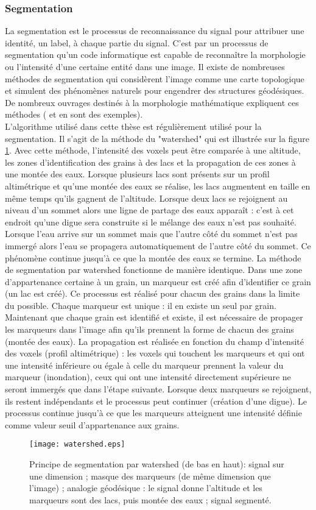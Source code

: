 		\subsubsection{Segmentation}
			La segmentation est le processus de reconnaissance du signal pour attribuer une identité, un label, à chaque partie du signal. C'est par un processus de segmentation qu'un code informatique est capable de reconnaître la morphologie ou l'intensité d'une certaine entité dans une image. Il existe de nombreuses méthodes de segmentation qui considèrent l'image comme une carte topologique et simulent des phénomènes naturels pour engendrer des structures géodésiques. De nombreux ouvrages destinés à la morphologie mathématique expliquent ces méthodes (\citet{haralick_image_1987} et \citet{dougherty_mathematical_1992} en sont des exemples).
			\\L'algorithme utilisé dans cette thèse est régulièrement utilisé pour la segmentation. Il s'agit de la méthode du "watershed" qui est illustrée sur la figure \ref{fig03:watershed}. Avec cette méthode, l'intensité des voxels peut être comparée à une altitude, les zones d'identification des grains à des lacs et la propagation de ces zones à une montée des eaux. Lorsque plusieurs lacs sont présents sur un profil altimétrique et qu'une montée des eaux se réalise, les lacs augmentent en taille en même temps qu'ils gagnent de l'altitude. Lorsque deux lacs se rejoignent au niveau d'un sommet alors une ligne de partage des eaux apparaît : c'est à cet endroit qu'une digue sera construite si le mélange des eaux n'est pas souhaité. Lorsque l'eau arrive sur un sommet mais que l'autre côté du sommet n'est pas immergé alors l'eau se propagera automatiquement de l'autre côté du sommet. Ce phénomène continue jusqu'à ce que la montée des eaux se termine.
			La méthode de segmentation par watershed fonctionne de manière identique. Dans une zone d'appartenance certaine à un grain, un marqueur est créé afin d'identifier ce grain (un lac est créé). Ce processus est réalisé pour chacun des grains dans la limite du possible. Chaque marqueur est unique : il en existe un seul par grain. Maintenant que chaque grain est identifié et existe, il est nécessaire de propager les marqueurs dans l'image afin qu'ils prennent la forme de chacun des grains (montée des eaux). La propagation est réalisée en fonction du champ d'intensité des voxels (profil altimétrique) : les voxels qui touchent les marqueurs et qui ont une intensité inférieure ou égale à celle du marqueur prennent la valeur du marqueur (inondation), ceux qui ont une intensité directement supérieure ne seront immergés que dans l'étape suivante. Lorsque deux marqueurs se rejoignent, ils restent indépendants et le processus peut continuer (création d'une digue). Le processus continue jusqu'à ce que les marqueurs atteignent une intensité définie comme valeur seuil d'appartenance aux grains.
			\begin{figure}\centering
				\texttt{[image: watershed.eps]}
				\caption{\label{fig03:watershed}Principe de segmentation par watershed (de bas en haut): signal sur une dimension ; masque des marqueurs (de même dimension que l'image) ; analogie géodésique : le signal donne l'altitude et les marqueurs sont des lacs, puis montée des eaux ; signal segmenté.}
			\end{figure}
